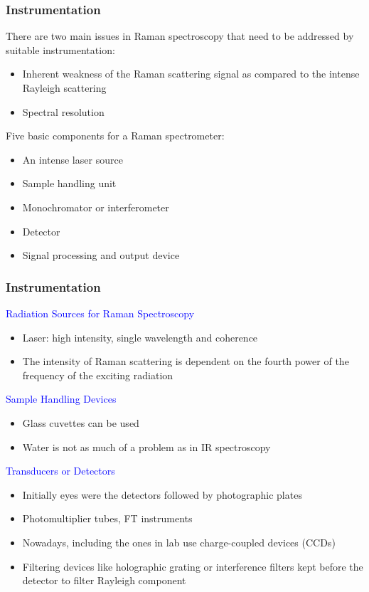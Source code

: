 \documentclass{beamer}
\begin{document}
\begin{frame}
\frametitle{Instrumentation}
There are two main issues in Raman spectroscopy that need to be addressed by 
suitable instrumentation:
\begin{itemize}[\textbullet]
\item Inherent weakness of the Raman scattering signal as compared to the intense Rayleigh scattering
\item Spectral resolution
\end{itemize}

Five basic components for a Raman spectrometer:
\begin{itemize}[\textbullet]
\item An intense laser source
\item Sample handling unit 
\item Monochromator or interferometer 
\item Detector 
\item Signal processing and output device
\end{itemize}
\end{frame}




\begin{frame}
\frametitle{Instrumentation}
\large{\textcolor{blue}{Radiation Sources for Raman Spectroscopy}}
\\
\begin{itemize}[\textbullet]
\item Laser: high intensity, single wavelength and 
coherence
\item The intensity of Raman scattering is dependent on the fourth power of the frequency 
of the exciting radiation
\end{itemize}

\large{\textcolor{blue}{Sample Handling Devices}}
\\
\begin{itemize}[\textbullet]
\item Glass cuvettes can be used
\item Water is not as much of a problem as in IR spectroscopy
\end{itemize}

\large{\textcolor{blue}{Transducers or Detectors}}
\\
\begin{itemize}[\textbullet]
\item Initially eyes were the detectors followed by photographic plates
\item Photomultiplier tubes, FT instruments
\item Nowadays, including the ones in lab use charge-coupled devices (CCDs)
\item Filtering devices like holographic grating or 
interference filters kept before the detector to filter Rayleigh component
\end{itemize}


\end{frame}
\end{document}
